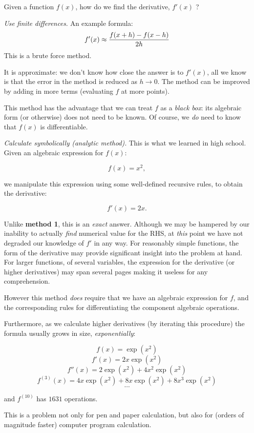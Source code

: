 \documentclass[11pt]{article}
\begin{document}
Given a function $f(x)$, how do we find the derivative, $f'(x)$ ?

{\it Use finite differences.} 
An example formula:
$$ f'(x) \approx {f(x+h)-f(x-h)\over 2h} $$
This is a brute force method.

It is approximate: we don't know how close the answer is to $f'(x)$,
all we know is that the error in the method is reduced as $h\to 0$.
The method can be improved by adding in more terms (evaluating $f$ at
more points). 

This method has the advantage that we can treat $f$ as a {\em black box}:
its algebraic form (or otherwise) does not need to be known. 
Of course, we {\em do} need to know that $f(x)$ is differentiable.


{\it Calculate symbolically (analytic method).}
This is what we learned in high school.
Given an algebraic expression for $f(x)$:

    $$ f(x) = x^2, $$

we manipulate this expression using some well-defined recursive rules, 
to obtain the derivative:

    $$ f'(x) = 2x. $$

Unlike {\bf method 1}, this is an {\em exact} answer. Although we may be hampered
by our inability to actually {\em find} numerical value for the RHS,
at {\em this} point we have not degraded our knowledge of $f'$ in any way.
For reasonably simple functions, the form of the derivative may provide significant
insight into the problem at hand. For larger functions, of several variables, the
expression for the derivative (or higher derivatives) may span several pages making
it useless for any comprehension.

However this method {\em does} require that we have an algebraic expression for $f$,
and the corresponding rules for differentiating the component algebraic operations.

Furthermore, as we calculate higher derivatives (by iterating this procedure) 
the formula usually grows in size, {\em exponentially}:

    $$ f(x)       = \exp(x^2) $$
    $$ f'(x)      = 2x\exp(x^2) $$
    $$ f''(x)     = 2\exp(x^2) + 4x^2\exp(x^2) $$
    $$ f^{(3)}(x) = 4x\exp(x^2) + 8x\exp(x^2) + 8x^3\exp(x^2)  $$
    $$ \dots $$

and $f^{(10)}$ has $1631$ operations.

This is a problem not only for pen and paper calculation, but
also for (orders of magnitude faster) computer program calculation.
\end{document}
